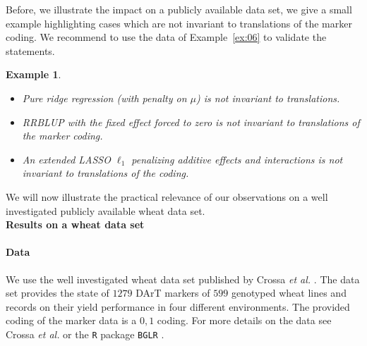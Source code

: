 \documentclass{bmcart}
\newtheorem{example}{Example}
\newcommand{\0}{\mathbf{0}}
\begin{document}
Before, we illustrate the impact on a publicly available data set, we give a small example highlighting cases which are not invariant to translations of the marker coding.
We recommend to use the data of Example~\ref{ex:06} to validate the statements.

\begin{example}~\\
	\begin{itemize} \item[a)] Pure ridge regression (with penalty on $\mu$) is not invariant to translations. 
		\item[b)] RRBLUP with the fixed effect forced to zero is not invariant to translations of the marker coding.
				\item[c)] An extended LASSO $\ell_1$ penalizing additive effects and interactions is not invariant to translations of the coding.
	\end{itemize}
\end{example} We will now illustrate the practical relevance of our observations on a well investigated publicly available wheat data set. \vspace{0.4cm}\\
{\bf Results on a wheat data set}\\

  
\paragraph{Data} We use the well investigated wheat data set published by Crossa {\it et al.} \cite{Crossa10}. The data set provides the state of $1279$ DArT markers of $599$ genotyped wheat lines and records on their yield performance in four different environments. The provided coding of the marker data is a $0,1$ coding. For more details on the data see Crossa {\it et al.} \cite{Crossa10} or the \texttt{R} \cite{RCoreTeam2016R:Computing} package \texttt{BGLR} \cite{BGLR}. \\
\end{document}
